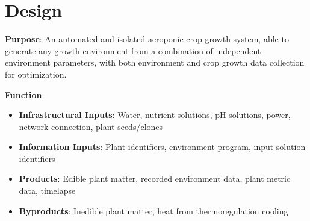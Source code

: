 \documentclass{../tex/report}
\begin{document}
\newpage

\section{Design}

\textbf{Purpose}: An automated and isolated aeroponic crop growth system, able to generate any growth environment from a combination of independent environment parameters, with both environment and crop growth data collection for optimization.

\textbf{Function}:
\begin{itemize}
    \item \textbf{Infrastructural Inputs}: Water, nutrient solutions, pH solutions, power, network connection, plant seeds/clones
    \item \textbf{Information Inputs}: Plant identifiers, environment program, input solution identifiers
    \item \textbf{Products}: Edible plant matter, recorded environment data, plant metric data, timelapse
    \item \textbf{Byproducts}: Inedible plant matter, heat from thermoregulation cooling
\end{itemize}
\end{document}
